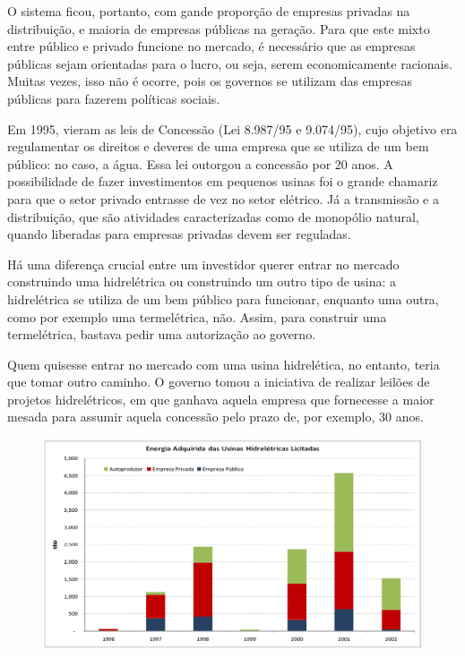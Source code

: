 O sistema ficou, portanto, com gande proporção de empresas privadas
na distribuição, e maioria de empresas públicas na geração. Para que
este mixto entre público e privado funcione no mercado, é necessário
que as empresas públicas sejam orientadas para o lucro, ou seja, serem
economicamente racionais. Muitas vezes, isso não é ocorre, pois os
governos se utilizam das empresas públicas para fazerem políticas
sociais.

Em 1995, vieram as leis de Concessão (Lei 8.987/95 e 9.074/95), cujo
objetivo era regulamentar os direitos e deveres de uma empresa que
se utiliza de um bem público: no caso, a água. Essa lei outorgou a
concessão por 20 anos. A possibilidade de fazer investimentos em pequenos
usinas foi o grande chamariz para que o setor privado entrasse de
vez no setor elétrico. Já a transmissão e a distribuição, que são
atividades caracterizadas como de monopólio natural, quando liberadas
para empresas privadas devem ser reguladas.

Há uma diferença crucial entre um investidor querer entrar no mercado
construindo uma hidrelétrica ou construindo um outro tipo de usina:
a hidrelétrica se utiliza de um bem público para funcionar, enquanto
uma outra, como por exemplo uma termelétrica, não. Assim, para construir
uma termelétrica, bastava pedir uma autorização ao governo.

Quem quisesse entrar no mercado com uma usina hidrelética, no entanto,
teria que tomar outro caminho. O governo tomou a iniciativa de realizar
leilões de projetos hidrelétricos, em que ganhava aquela empresa que
fornecesse a maior mesada para assumir aquela concessão pelo prazo
de, por exemplo, 30 anos. 

\begin{figure}
\begin{centering}
\includegraphics[scale=0.5]{anexos/aula110-1}
\par\end{centering}

\protect\caption{}


\end{figure}


